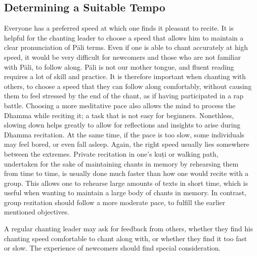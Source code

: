 \subsection*{Determining a Suitable Tempo}
\begin{justify}
  Everyone has a preferred speed at which one finds it pleasant to recite. It is helpful for the chanting leader to choose a speed that allows him to maintain a clear pronunciation of Pāli terms. Even if one is able to chant accurately at high speed, it would be very difficult for newcomers and those who are not familiar with Pāli, to follow along. Pāli is not our mother tongue, and fluent reading requires a lot of skill and practice. It is therefore important when chanting with others, to choose a speed that they can follow along comfortably, without causing them to feel stressed by the end of the chant, as if having participated in a rap battle. Choosing a more meditative pace also allows the mind to process the Dhamma while reciting it; a task that is not easy for beginners. Nonethless, slowing down helps greatly to allow for reflections and insights to arise during Dhamma recitation. At the same time, if the pace is too slow, some individuals may feel bored, or even fall asleep. Again, the right speed usually lies somewhere between the extremes. Private recitation in one's kuṭi or walking path, undertaken for the sake of maintaining chants in memory by rehearsing them from time to time, is usually done much faster than how one would recite with a group. This allows one to rehearse large amounts of texts in short time, which is useful when wanting to maintain a large body of chants in memory. In contrast, group rezitation should follow a more moderate pace, to fulfill the earlier mentioned objectives.

  A regular chanting leader may ask for feedback from others, whether they find his chanting speed comfortable to chant along with, or whether they find it too fast or slow. The experience of newcomers should find special consideration.
\end{justify}


